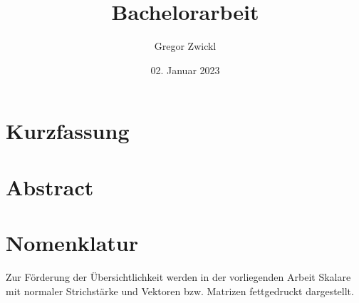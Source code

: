 \documentclass[
	final, 			%
	paper=a4, 		%
	pagesize=auto,	%
	fontsize=12pt, 	%
	ngerman, 		%
	openright,		%
	numbers=noendperiod,	%
]{scrreprt}
\title{Bachelorarbeit}
\author{Gregor Zwickl}
\date{02. Januar 2023}
\renewcommand{\baselinestretch}{1}\normalsize		%
\begin{document}

\addtocounter{page}{-1}

\newpage
\pagestyle{empty}
\phantom{t}										%
\addtocounter{page}{-1}

\newpage

\addtocounter{page}{-1}


\addtocounter{page}{-1}



\chapter*{Kurzfassung}

\newpage
\chapter*{Abstract}
\newpage
\renewcommand*{\chapterheadstartvskip}{\vspace*{2.3\baselineskip}}	%
\renewcommand{\baselinestretch}{1.2}\normalsize						%
\tableofcontents													%
\renewcommand{\baselinestretch}{1.25}\normalsize					%
\renewcommand*{\chapterheadstartvskip}{\vspace*{2.3\baselineskip}}	%
\chapter*{Nomenklatur}
Zur Förderung der Übersichtlichkeit werden in der vorliegenden Arbeit Skalare mit normaler Strichstärke und Vektoren bzw. Matrizen fettgedruckt dargestellt.
\renewcommand{\baselinestretch}{1.1}\normalsize						%

\renewcommand{\baselinestretch}{1.25}\normalsize					%
\end{document}
